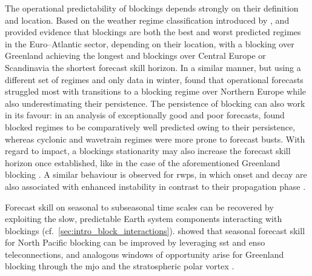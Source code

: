 The operational predictability of blockings depends strongly on their
definition and location. Based on the weather regime classification introduced
by \textcite{gramsBalancingEuropesWindpower2017},
\textcite{buelerYearroundSubseasonalForecast2021} and
\textcite{osmanMultimodelAssessmentSubseasonal2023} provided evidence that
blockings are both the best and worst predicted regimes in the Euro--Atlantic
sector, depending on their location, with a blocking over Greenland achieving
the longest and blockings over Central Europe or Scandinavia the shortest
forecast skill horizon.
In a similar manner, but using a different set of
regimes and only data in winter,
\textcite{ferrantiFlowdependentVerificationECMWF2015} found that operational
forecasts struggled most with transitions to a blocking regime over Northern
Europe while also underestimating their persistence. The persistence of
blocking can also work in its favour: in an analysis of exceptionally good and
poor forecasts, \textcite{hauserExceptionallyPoorGood2026} found blocked
regimes to be comparatively well predicted owing to their persistence, whereas
cyclonic and wavetrain regimes were more prone to forecast busts.
With regard to impact, a blockings stationarity
may also increase the forecast skill horizon once established, like in the
case of the aforementioned Greenland blocking
\parencite{spaethFlowDependenceEnsembleSpread2024}. A similar behaviour is
observed for \glspl{rwp}, in which onset and decay are also associated
with enhanced instability in contrast to their propagation phase
\parencite{prestel-kupfererPredictabilityMidlatitudeRossbywave2024}.

Forecast skill on seasonal to subseasonal time scales can be recovered by
exploiting the slow, predictable Earth system components interacting
with blockings (cf.~\cref{sec:intro_block_interactions}).
\textcite{parkHybridApproachSkillful2024} showed that seasonal forecast skill
for North Pacific blocking can be improved
by leveraging \gls{sst} and \gls{enso} teleconnections, and analogous windows
of opportunity arise for Greenland blocking through the \gls{mjo} and the
stratospheric polar vortex \parencite{spaethFlowDependenceEnsembleSpread2024,
    mockertWindowsOpportunitySubseasonal2026}.

